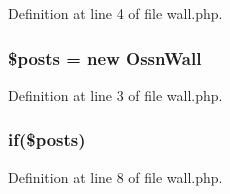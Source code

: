 Definition at line 4 of file wall.\+php.

\subsubsection[{\texorpdfstring{\$posts}{$posts}}]{\setlength{\rightskip}{0pt plus 5cm}\$posts = new {\bf Ossn\+Wall}}\hypertarget{wall_2user_2wall_8php_a9f4cad5a721e7f7711fba0bf0f7ec273}{}\label{wall_2user_2wall_8php_a9f4cad5a721e7f7711fba0bf0f7ec273}


Definition at line 3 of file wall.\+php.

\subsubsection[{\texorpdfstring{if}{if}}]{\setlength{\rightskip}{0pt plus 5cm}if(\$posts)}\hypertarget{wall_2user_2wall_8php_ac93ec01c6c1a973ed7349172ed00521f}{}\label{wall_2user_2wall_8php_ac93ec01c6c1a973ed7349172ed00521f}


Definition at line 8 of file wall.\+php.

